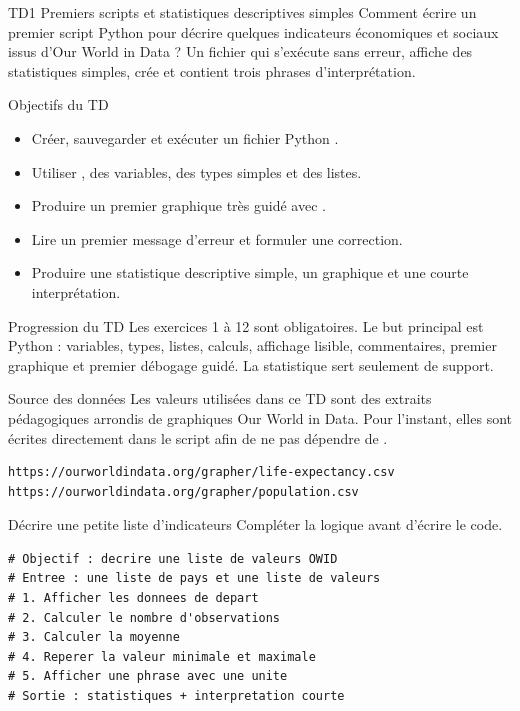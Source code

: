 \documentclass[11pt,a4paper]{article}
\begin{document}
\workbooktitle
  {TD1}
  {Premiers scripts et statistiques descriptives simples}
  {Comment écrire un premier script Python pour décrire quelques indicateurs économiques et sociaux issus d'Our World in Data ?}
  {Un fichier  qui s'exécute sans erreur, affiche des statistiques simples, crée  et contient trois phrases d'interprétation.}

\begin{objectivebox}{Objectifs du TD}
\begin{itemize}
  \item Créer, sauvegarder et exécuter un fichier Python .
  \item Utiliser , des variables, des types simples et des listes.
  \item Produire un premier graphique très guidé avec .
  \item Lire un premier message d'erreur et formuler une correction.
  \item Produire une statistique descriptive simple, un graphique et une courte interprétation.
\end{itemize}
\end{objectivebox}

\begin{checkpointbox}{Progression du TD}
Les exercices 1 à 12 sont obligatoires. Le but principal est Python : variables, types, listes, calculs, affichage lisible, commentaires, premier graphique et premier débogage guidé. La statistique sert seulement de support.
\end{checkpointbox}

\begin{checkpointbox}{Source des données}
Les valeurs utilisées dans ce TD sont des extraits pédagogiques arrondis de graphiques Our World in Data. Pour l'instant, elles sont écrites directement dans le script afin de ne pas dépendre de .
\begin{lstlisting}[language=terminal]
https://ourworldindata.org/grapher/life-expectancy.csv
https://ourworldindata.org/grapher/population.csv
\end{lstlisting}
\end{checkpointbox}

\begin{pseudocodeexercise}{Décrire une petite liste d'indicateurs}
Compléter la logique avant d'écrire le code.
\begin{lstlisting}
# Objectif : decrire une liste de valeurs OWID
# Entree : une liste de pays et une liste de valeurs
# 1. Afficher les donnees de depart
# 2. Calculer le nombre d'observations
# 3. Calculer la moyenne
# 4. Reperer la valeur minimale et maximale
# 5. Afficher une phrase avec une unite
# Sortie : statistiques + interpretation courte
\end{lstlisting}
\end{pseudocodeexercise}
\end{document}
